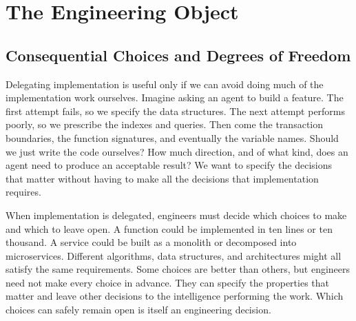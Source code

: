 


\chapter{The Engineering Object}\label{heading:the-engineering-object}

\section{Consequential Choices and Degrees of Freedom}\label{heading:consequential-choices-and-degrees-of-freedom}

Delegating implementation is useful only if we can avoid doing much of the implementation work ourselves. Imagine asking an agent to build a feature. The first attempt fails, so we specify the data structures. The next attempt performs poorly, so we prescribe the indexes and queries. Then come the transaction boundaries, the function signatures, and eventually the variable names. Should we just write the code ourselves? How much direction, and of what kind, does an agent need to produce an acceptable result? We want to specify the decisions that matter without having to make all the decisions that implementation requires.


When implementation is delegated, engineers must decide which choices to make and which to leave open. A function could be implemented in ten lines or ten thousand. A service could be built as a monolith or decomposed into microservices. Different algorithms, data structures, and architectures might all satisfy the same requirements. Some choices are better than others, but engineers need not make every choice in advance. They can specify the properties that matter and leave other decisions to the intelligence performing the work. Which choices can safely remain open is itself an engineering decision.

